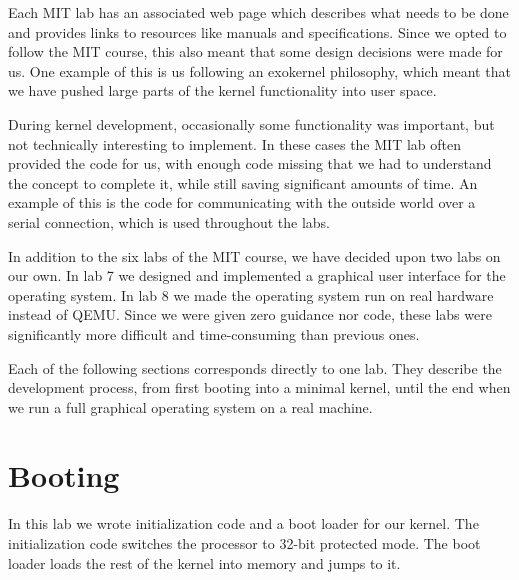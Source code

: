 \documentclass{report}
\begin{document}
Each MIT lab has an associated web page which describes what needs to be done
and provides links to resources like manuals and specifications. Since we opted
to follow the MIT course, this also meant that some design decisions were made
for us. One example of this is us following an exokernel philosophy, which
meant that we have pushed large parts of the kernel functionality into user
space.

During kernel development, occasionally some functionality was important,
but not technically interesting to implement. In these cases the MIT lab often
provided the code for us, with enough code missing that we had to understand
the concept to complete it, while still saving significant amounts of time. An
example of this is the code for communicating with the outside world over a
serial connection, which is used throughout the labs.


In addition to the six labs of the MIT course, we have decided upon two labs
on our own. In lab 7 we designed and implemented a graphical user interface
for the operating system. In lab 8 we made the operating system run on real
hardware instead of QEMU. Since we were given zero guidance nor code, these
labs were significantly more difficult and time-consuming than previous ones.

Each of the following sections corresponds directly to one lab. They describe
the development process, from first booting into a minimal kernel, until the end
when we run a full graphical operating system on a real machine.









\chapter{Booting}
\label{sec:lab1}

In this lab we wrote initialization code and a boot loader for our kernel. 
The initialization code switches the processor to 32-bit protected mode. The
boot loader loads the rest of the kernel into memory and jumps to it.
\end{document}
